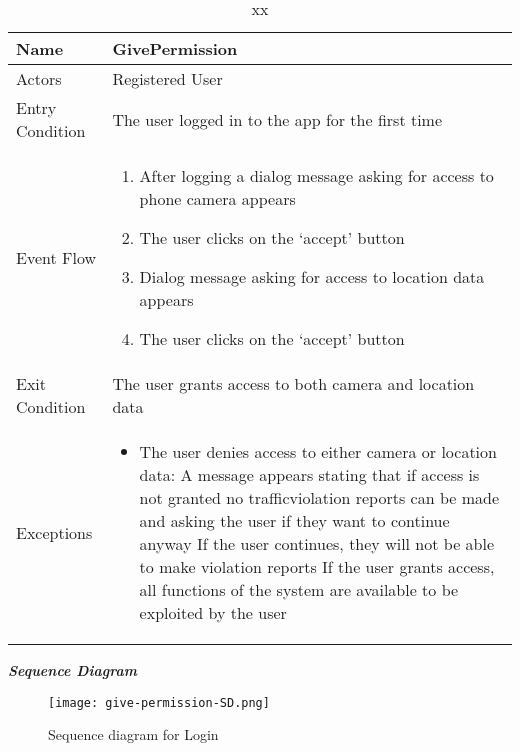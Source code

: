 \begin{table}[!hbtp]
\footnotesize
\centering
\settowidth{}
\setlength\extrarowheight{2pt}
\begin{tabulary}{\textwidth}{|J|J|}
\hline
Name            & GivePermission \\
\hline 
Actors          & Registered User \\
\hline 
Entry Condition & The user logged in to the app for the first time \\
\hline 
Event Flow      & 
\begin{minipage}[t]{0.7\textwidth}
\begin{enumerate} 
\item After logging a dialog message asking for access to phone camera appears
\item The user clicks on the ‘accept’ button
\item Dialog message asking for access to location data appears
\item The user clicks on the ‘accept’ button
\end{enumerate}
\end{minipage}\\
\hline

Exit Condition  & The user grants access to both camera and location data \\
\hline 
Exceptions      & 
\begin{minipage}[t]{0.8\textwidth}
\begin{itemize} 
\item The user denies access to either camera or location data: A message appears stating that if access is not granted no trafficviolation reports can be made and asking the user if they want to continue anyway If the user continues, they will not be able to make violation reports If the user grants access, all functions of the system are available to be exploited by the user
\end{itemize}
\end{minipage}\\
\hline
\end{tabulary}
\caption{\label{tab:xx}xx}
\end{table}

\emph{\textbf{Sequence Diagram}}

\begin{figure}[H]
\caption{Sequence diagram for Login}
\label{fig:SD-login}
\centering
\texttt{[image: give-permission-SD.png]}
\end{figure}

